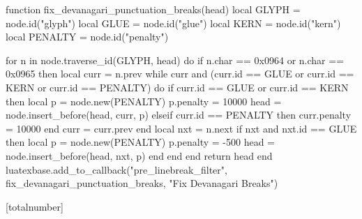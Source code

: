 


\makeatletter
\def\devanagaridigits#1{\expandafter\@devanagaridigits\number#1@}
\def\@devanagaridigits#1{%
  \ifx#1@\else
    \ifcase#1 ०\or १\or २\or ३\or ४\or ५\or ६\or ७\or ८\or ९\fi
    \expandafter\@devanagaridigits
  \fi
}
\makeatother

\usepackage{luacode}
\begin{luacode*}
function fix_devanagari_punctuation_breaks(head)
  local GLYPH = node.id("glyph")
  local GLUE  = node.id("glue")
  local KERN  = node.id("kern")
  local PENALTY = node.id("penalty")

  for n in node.traverse_id(GLYPH, head) do
    if n.char == 0x0964 or n.char == 0x0965 then
      local curr = n.prev
      while curr and (curr.id == GLUE or curr.id == KERN or curr.id == PENALTY) do
        if curr.id == GLUE or curr.id == KERN then
            local p = node.new(PENALTY)
            p.penalty = 10000 
            head = node.insert_before(head, curr, p)
        elseif curr.id == PENALTY then
            curr.penalty = 10000 
        end
        curr = curr.prev
      end
      local nxt = n.next
      if nxt and nxt.id == GLUE then
         local p = node.new(PENALTY)
         p.penalty = -500 
         head = node.insert_before(head, nxt, p)
      end
    end
  end
  return head
end
luatexbase.add_to_callback("pre_linebreak_filter", fix_devanagari_punctuation_breaks, "Fix Devanagari Breaks")
\end{luacode*}

\sloppy
\emergencystretch=5cm

    \renewcommand{\thepage}{\devanagaridigits{\value{page}}}
    [totalnumber]

